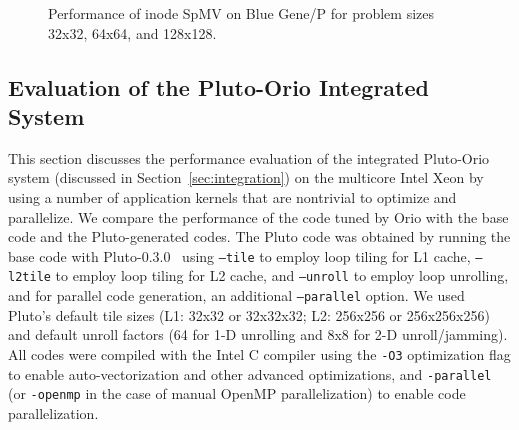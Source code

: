 {\begin{figure}
\begin{center}
{  \label{fig:ex27-bgp-vn-64x64} 
  } 
\end{center}
\caption{Performance of inode SpMV on Blue Gene/P for problem sizes 32x32, 64x64, and 128x128.} 
\label{fig:ex27-bgp-results2} 
\end{figure} 
}

\subsection{Evaluation of the Pluto-Orio Integrated System} 

This section discusses the performance evaluation of the integrated
Pluto-Orio system (discussed in Section~\ref{sec:integration}) on the
multicore Intel Xeon by using a number of application kernels that are
nontrivial to optimize and parallelize. We compare the performance of the
code tuned by Orio with the base code and the Pluto-generated codes. The
Pluto code was obtained by running the base code with
Pluto-0.3.0~\cite{pluto030} using \texttt{--tile} to employ loop tiling for
L1 cache, \texttt{--l2tile} to employ loop tiling for L2 cache, and
\texttt{--unroll} to employ loop unrolling, and for parallel code generation,
an additional \texttt{--parallel} option. We used Pluto's default tile
sizes (L1: 32x32 or 32x32x32; L2: 256x256 or 256x256x256) and default
unroll factors (64 for 1-D unrolling and 8x8 for 2-D
unroll/jamming). All codes were compiled with the Intel C compiler
using the \texttt{-O3} optimization flag to enable auto-vectorization
and other advanced optimizations, and
\texttt{-parallel} (or \texttt{-openmp} in the case of manual OpenMP parallelization) 
to enable code parallelization.
 
